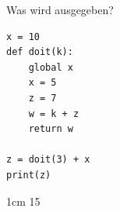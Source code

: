 
\question[1]
Was wird ausgegeben?

 
\begin{lstlisting}
x = 10 
def doit(k):
    global x
    x = 5
    z = 7
    w = k + z
    return w

z = doit(3) + x
print(z) 
\end{lstlisting}

\begin{solutionbox}{1cm}
15
\end{solutionbox}
